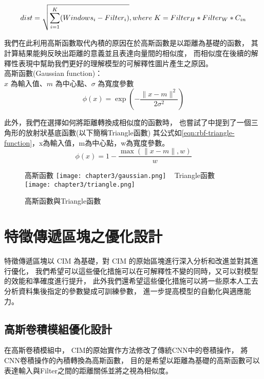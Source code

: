 \documentclass[class=NCU_thesis, crop=false]{standalone}
\begin{document}
	\begin{equation}
	    \label{eq:eq-EulideanDist}
	    dist = \sqrt{\sum_{i = 1}^{K} (Windows_{i} - Filter_{i})},\\ where \; K = Filter_{H} * Filter_{W} * C_{in}
	\end{equation}

		我們在此利用高斯函數取代內積的原因在於高斯函數是以距離為基礎的函數，
	其計算結果能夠反映出距離的意義並且表達向量間的相似度，
	而相似度在後續的解釋性表現中幫助我們更好的理解模型的可解釋性圖片產生之原因。\\
	高斯函數(Gaussian function)：\\
	  $x$ 為輸入值、$m$ 為中心點、$\sigma$ 為寬度參數
	  \begin{equation}
	      \label{eqn:rbf-gaussian-function}
	      \phi (x) = \exp \left( -\frac{\| x-m \|^2}{2\sigma ^2} \right) 
	  \end{equation}

  	此外，我們在選擇如何將距離轉換成相似度的函數時，
  	也嘗試了\cite{YangCNNInterpretable}中提到了一個三角形的放射狀基底函數(以下簡稱Triangle函數)
  	其公式如\cref{eqn:rbf-triangle-function}，x為輸入值，m為中心點，w為寬度參數。
  	\begin{equation}
      \label{eqn:rbf-triangle-function}
      \phi (x) = 1 - \frac{ \max \left( \| x-m \|, w \right)}{w}
  	\end{equation}

  	\begin{figure}[H]
    \centering
    \subcaptionbox
        {高斯函數
        \label{fig:gaussian}}
        {\texttt{[image: chapter3/gaussian.png]}}
    ~
    \subcaptionbox
        {Triangle函數
        \label{fig:triangle}}
        {\texttt{[image: chapter3/triangle.png]}}
    \caption{高斯函數與Triangle函數\cite{YangCNNInterpretable}}
    \label{fig:rbf}
	\end{figure}


\pagebreak
\section{特徵傳遞區塊之優化設計}
\label{chapter:chapter3.4}
特徵傳遞區塊以 CIM 為基礎，對 CIM 的原始區塊進行深入分析和改進並對其進行優化，
我們希望可以這些優化措施可以在可解釋性不變的同時，又可以對模型的效能和準確度進行提升，
此外我們還希望這些優化措施可以將一些原本人工去分析資料集後指定的參數變成可訓練參數，
進一步提高模型的自動化與適應能力。

	\subsection{高斯卷積模組優化設計}
	在高斯卷積模組中，
	CIM的原始實作方法修改了傳統CNN\cite{726791}中的卷積操作，
	將CNN卷積操作的內積轉換為高斯函數，
	目的是希望以距離為基礎的高斯函數可以表達輸入與Filter之間的距離關係並將之視為相似度。
\end{document}
